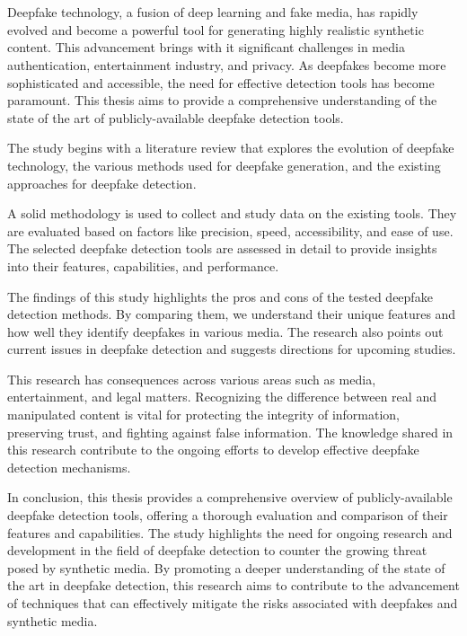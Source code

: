 \chapter{\abstractname}

Deepfake technology, a fusion of deep learning and fake media, has rapidly 
evolved and become a powerful tool for generating highly realistic synthetic 
content. This advancement brings with it significant challenges in media 
authentication, entertainment industry, and privacy. As deepfakes become more 
sophisticated and accessible, the need for effective detection tools has become 
paramount. This thesis aims to provide a comprehensive understanding of 
the state of the art of publicly-available deepfake detection tools.

The study begins with a literature review that explores the evolution of 
deepfake technology, the various methods used for deepfake generation, 
and the existing approaches for deepfake detection. 

A solid methodology is used to collect and study data on the existing tools. 
They are evaluated based on factors like precision, speed, accessibility, 
and ease of use. The selected deepfake detection tools are assessed in detail 
to provide insights into their features, capabilities, and performance.

The findings of this study highlights the pros and cons of the tested 
deepfake detection methods. By comparing them, we understand their unique features 
and how well they identify deepfakes in various media. The research also points out 
current issues in deepfake detection and suggests directions for upcoming studies.

This research has consequences across various areas such as media, entertainment, 
and legal matters. Recognizing the difference between real and manipulated content 
is vital for protecting the integrity of information, preserving trust, and 
fighting against false information. The knowledge shared in this research contribute 
to the ongoing efforts to develop effective deepfake detection mechanisms.

In conclusion, this thesis provides a comprehensive overview of publicly-available 
deepfake detection tools, offering a thorough evaluation and comparison of their 
features and capabilities. The study highlights the need for ongoing research and 
development in the field of deepfake detection to counter the growing threat 
posed by synthetic media. By promoting a deeper understanding of the state of 
the art in deepfake detection, this research aims to contribute to the 
advancement of techniques that can effectively mitigate the risks associated 
with deepfakes and synthetic media.
